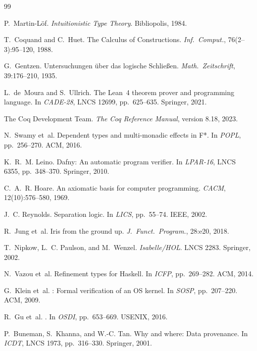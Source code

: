 \documentclass[11pt]{article}
\begin{document}
\begin{thebibliography}{99}

P.~Martin-L\"of.
\newblock \emph{Intuitionistic Type Theory}.
\newblock Bibliopolis, 1984.

T.~Coquand and C.~Huet.
\newblock The {Calculus of Constructions}.
\newblock \emph{Inf.\ Comput.}, 76(2--3):95--120, 1988.

G.~Gentzen.
\newblock Untersuchungen \"uber das logische {S}chlie{\ss}en.
\newblock \emph{Math.\ Zeitschrift}, 39:176--210, 1935.

L.~de~Moura and S.~Ullrich.
\newblock The {Lean~4} theorem prover and programming language.
\newblock In \emph{CADE-28}, LNCS 12699, pp.~625--635. Springer, 2021.

The Coq Development Team.
\newblock \emph{The {Coq} Reference Manual}, version 8.18, 2023.

N.~Swamy et~al.
\newblock Dependent types and multi-monadic effects in {F*}.
\newblock In \emph{POPL}, pp.~256--270. ACM, 2016.

K.~R.~M. Leino.
\newblock Dafny: An automatic program verifier.
\newblock In \emph{LPAR-16}, LNCS 6355, pp.~348--370. Springer, 2010.

C.~A.~R. Hoare.
\newblock An axiomatic basis for computer programming.
\newblock \emph{CACM}, 12(10):576--580, 1969.

J.~C. Reynolds.
\newblock Separation logic.
\newblock In \emph{LICS}, pp.~55--74. IEEE, 2002.

R.~Jung et~al.
\newblock Iris from the ground up.
\newblock \emph{J.\ Funct.\ Program.}, 28:e20, 2018.

T.~Nipkow, L.~C. Paulson, and M.~Wenzel.
\newblock \emph{Isabelle/HOL}.
\newblock LNCS 2283. Springer, 2002.

N.~Vazou et~al.
\newblock Refinement types for {Haskell}.
\newblock In \emph{ICFP}, pp.~269--282. ACM, 2014.

G.~Klein et~al.
: Formal verification of an {OS} kernel.
\newblock In \emph{SOSP}, pp.~207--220. ACM, 2009.

R.~Gu et~al.
.
\newblock In \emph{OSDI}, pp.~653--669. USENIX, 2016.

P.~Buneman, S.~Khanna, and W.-C. Tan.
\newblock Why and where: Data provenance.
\newblock In \emph{ICDT}, LNCS 1973, pp.~316--330. Springer, 2001.


\end{thebibliography}
\end{document}
